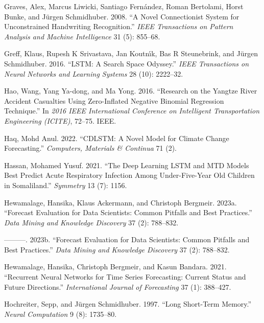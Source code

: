 \documentclass[
  letterpaper,
  double,
  12pt,
  1.0in]{beavtex}
\newlength{\cslhangindent}
\newenvironment{CSLReferences}[2] %
 {\begin{list}{}{%
  \setlength{\itemindent}{0pt}
  \setlength{\leftmargin}{0pt}
  \setlength{\parsep}{0pt}
  \ifodd #1
   \setlength{\leftmargin}{\cslhangindent}
   \setlength{\itemindent}{-1\cslhangindent}
  \fi
  \setlength{\itemsep}{#2\baselineskip}}}
 {\end{list}}
\begin{document}
\begin{CSLReferences}{1}{0}
Graves, Alex, Marcus Liwicki, Santiago Fernández, Roman Bertolami, Horst
Bunke, and Jürgen Schmidhuber. 2008. {``A Novel Connectionist System for
Unconstrained Handwriting Recognition.''} \emph{IEEE Transactions on
Pattern Analysis and Machine Intelligence} 31 (5): 855--68.

Greff, Klaus, Rupesh K Srivastava, Jan Koutnı́k, Bas R Steunebrink, and
Jürgen Schmidhuber. 2016. {``LSTM: A Search Space Odyssey.''} \emph{IEEE
Transactions on Neural Networks and Learning Systems} 28 (10): 2222--32.

Hao, Wang, Yang Ya-dong, and Ma Yong. 2016. {``Research on the Yangtze
River Accident Casualties Using Zero-Inflated Negative Binomial
Regression Technique.''} In \emph{2016 IEEE International Conference on
Intelligent Transportation Engineering (ICITE)}, 72--75. IEEE.

Haq, Mohd Anul. 2022. {``CDLSTM: A Novel Model for Climate Change
Forecasting.''} \emph{Computers, Materials \& Continua} 71 (2).

Hassan, Mohamed Yusuf. 2021. {``The Deep Learning LSTM and MTD Models
Best Predict Acute Respiratory Infection Among Under-Five-Year Old
Children in Somaliland.''} \emph{Symmetry} 13 (7): 1156.

Hewamalage, Hansika, Klaus Ackermann, and Christoph Bergmeir. 2023a.
{``Forecast Evaluation for Data Scientists: Common Pitfalls and Best
Practices.''} \emph{Data Mining and Knowledge Discovery} 37 (2):
788--832.

---------. 2023b. {``Forecast Evaluation for Data Scientists: Common
Pitfalls and Best Practices.''} \emph{Data Mining and Knowledge
Discovery} 37 (2): 788--832.

Hewamalage, Hansika, Christoph Bergmeir, and Kasun Bandara. 2021.
{``Recurrent Neural Networks for Time Series Forecasting: Current Status
and Future Directions.''} \emph{International Journal of Forecasting} 37
(1): 388--427.

Hochreiter, Sepp, and Jürgen Schmidhuber. 1997. {``Long Short-Term
Memory.''} \emph{Neural Computation} 9 (8): 1735--80.


\end{CSLReferences}
\end{document}
